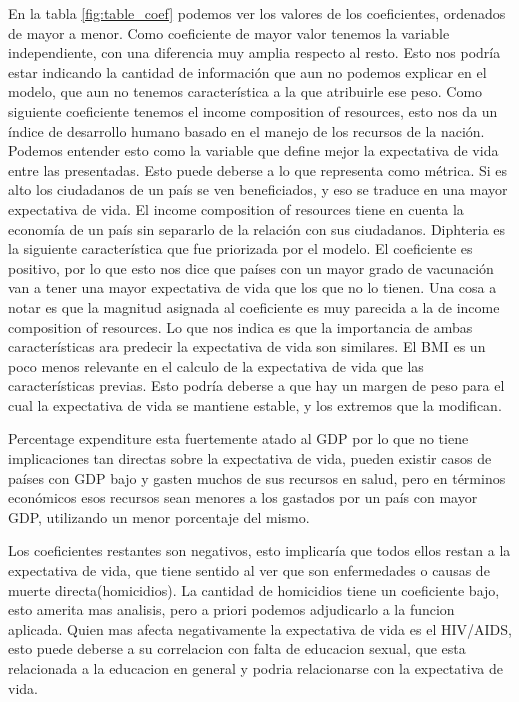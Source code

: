 En la tabla \ref{fig:table_coef} podemos ver los valores de los coeficientes, ordenados de mayor a menor.
Como coeficiente de mayor valor tenemos la variable independiente, con una diferencia muy amplia respecto al resto. Esto nos podría estar indicando la cantidad de información que aun no podemos explicar en el modelo, que aun no tenemos característica a la que atribuirle ese peso.
Como siguiente coeficiente tenemos el income composition of resources, esto nos da un índice de desarrollo humano basado en el manejo de los recursos de la nación. Podemos entender esto como la variable que define mejor la expectativa de vida entre las presentadas. Esto puede deberse a lo que representa como métrica. Si es alto los ciudadanos de un país se ven beneficiados, y eso se traduce en una mayor expectativa de vida. El income composition of resources tiene en cuenta la economía de un país sin separarlo de la relación con sus ciudadanos.
Diphteria es la siguiente característica que fue priorizada por el modelo. El coeficiente es positivo, por lo que esto nos dice que países con un mayor grado de vacunación van a tener una mayor expectativa de vida que los que no lo tienen. Una cosa a notar es que la magnitud asignada al coeficiente es muy parecida a la de income composition of resources. Lo que nos indica es que la importancia de ambas características ara predecir la expectativa de vida son similares.
El BMI es un poco menos relevante en el calculo de la expectativa de vida que las características previas. Esto podría deberse a que hay un margen de peso para el cual la expectativa de vida se mantiene estable, y los extremos que la modifican.

Percentage expenditure esta fuertemente atado al GDP por lo que no tiene implicaciones tan directas sobre la expectativa de vida, pueden existir casos de países con GDP bajo y gasten muchos de sus recursos en salud, pero en términos económicos esos recursos sean menores a los gastados por un país con mayor GDP, utilizando un menor porcentaje del mismo.

Los coeficientes restantes son negativos, esto implicaría que todos ellos restan a la expectativa de vida, que tiene sentido al ver que son enfermedades o causas de muerte directa(homicidios).
La cantidad de homicidios tiene un coeficiente bajo, esto amerita mas analisis, pero a priori podemos adjudicarlo a la funcion aplicada. 
Quien mas afecta negativamente la expectativa de vida es el HIV/AIDS, esto puede deberse a su correlacion con falta de educacion sexual, que esta relacionada a la educacion en general y  podria relacionarse con la expectativa de vida.